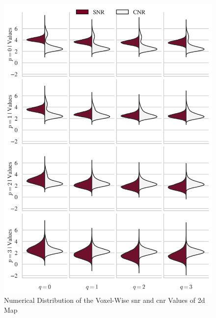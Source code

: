 \begin{figure}[htbp!]
\centering
\includegraphics{images/cnrsnr2d.png}
\caption{Numerical Distribution of the Voxel-Wise \gls{snr} and \gls{cnr} Values of \gls{2d} Map}
\label{fig:cnrsnr2d}
\end{figure}

